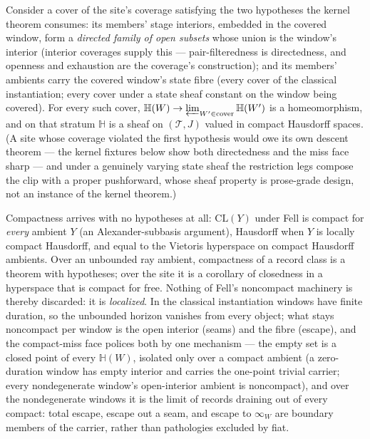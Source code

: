 \begin{proposition}
\label{prop:su-carrier-sheaf}
Consider a cover of the site's coverage satisfying the two
hypotheses the kernel theorem consumes: its members' stage
interiors, embedded in the covered window, form a \emph{directed
family of open subsets} whose union is the window's interior
(interior coverages supply this --- pair-filteredness is
directedness, and openness and exhaustion are the coverage's
construction); and its members' ambients carry the covered window's
state fibre (every cover of the classical instantiation; every
cover under a state sheaf constant on the window being covered).
For every such cover,
$\mathbb{H}(W) \to \varprojlim_{W' \in \mathrm{cover}} \mathbb{H}(W')$
is a homeomorphism, and on that stratum $\mathbb{H}$ is a sheaf on
$(\mathcal{T}, J)$ valued in compact Hausdorff spaces. (A site
whose coverage violated the first hypothesis would owe its own
descent theorem --- the kernel fixtures below show both directedness
and the miss face sharp --- and under a genuinely varying state
sheaf the restriction legs compose the clip with a proper
pushforward, whose sheaf property is prose-grade design, not an
instance of the kernel theorem.)
\end{proposition}

Compactness arrives with no
hypotheses at all: $\mathrm{CL}(Y)$ under Fell is compact for
\emph{every} ambient $Y$ (an Alexander-subbasis argument), Hausdorff
when $Y$ is locally compact Hausdorff, and equal to the Vietoris
hyperspace on compact Hausdorff ambients. Over an unbounded ray
ambient, compactness of a record class is a theorem with hypotheses;
over the site it is a corollary of
closedness in a hyperspace that is compact for free. Nothing of
Fell's noncompact machinery is thereby discarded: it is
\emph{localized}. In the classical instantiation windows have
finite duration, so the unbounded horizon vanishes from every
object; what stays noncompact per window is the open interior
(seams) and the fibre (escape), and the compact-miss face polices
both by one mechanism --- the empty set is a closed point of every
$\mathbb{H}(W)$, isolated only over a compact ambient (a
zero-duration window has empty interior and carries the one-point
trivial carrier; every nondegenerate window's open-interior ambient
is noncompact), and over the nondegenerate windows it is the limit
of records draining out of every compact: total escape, escape out
a seam, and escape to $\infty_W$ are boundary members of the
carrier, rather than pathologies excluded by fiat.

